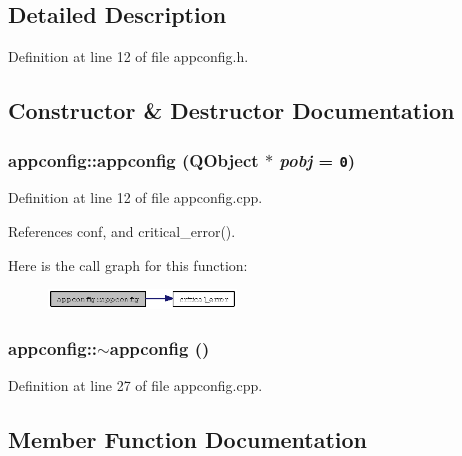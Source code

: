 \subsection{Detailed Description}




Definition at line 12 of file appconfig.h.

\subsection{Constructor \& Destructor Documentation}
\subsubsection{\setlength{\rightskip}{0pt plus 5cm}appconfig::appconfig (QObject $\ast$ {\em pobj} = {\tt 0})}\label{classappconfig_41b9c49818b354cef430735da328680e}




Definition at line 12 of file appconfig.cpp.

References conf, and critical\_\-error().

Here is the call graph for this function:\begin{figure}[H]
\begin{center}
\leavevmode
\includegraphics[width=142pt]{classappconfig_41b9c49818b354cef430735da328680e_cgraph}
\end{center}
\end{figure}
\subsubsection{\setlength{\rightskip}{0pt plus 5cm}appconfig::$\sim$appconfig ()}\label{classappconfig_df61bed4f7f8f151b8d0a839b386335f}




Definition at line 27 of file appconfig.cpp.

\subsection{Member Function Documentation}

